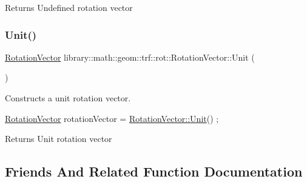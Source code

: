 \begin{DoxyReturn}{Returns}
Undefined rotation vector 
\end{DoxyReturn}
\mbox{\label{classlibrary_1_1math_1_1geom_1_1trf_1_1rot_1_1_rotation_vector_a6dd13d867fa6080a5d45be164ce30c9b}} 
\subsubsection{\texorpdfstring{Unit()}{Unit()}}
{\footnotesize\ttfamily \hyperlink{classlibrary_1_1math_1_1geom_1_1trf_1_1rot_1_1_rotation_vector}{Rotation\+Vector} library\+::math\+::geom\+::trf\+::rot\+::\+Rotation\+Vector\+::\+Unit (\begin{DoxyParamCaption}{ }\end{DoxyParamCaption})\hspace{0.3cm}{\ttfamily [static]}}



Constructs a unit rotation vector. 


\begin{DoxyCode}
\hyperlink{classlibrary_1_1math_1_1geom_1_1trf_1_1rot_1_1_rotation_vector_a32b1fab5e81bc24d777324daf5849205}{RotationVector} rotationVector = \hyperlink{classlibrary_1_1math_1_1geom_1_1trf_1_1rot_1_1_rotation_vector_a6dd13d867fa6080a5d45be164ce30c9b}{RotationVector::Unit}() ;
\end{DoxyCode}


\begin{DoxyReturn}{Returns}
Unit rotation vector 
\end{DoxyReturn}


\subsection{Friends And Related Function Documentation}
\mbox{\label{classlibrary_1_1math_1_1geom_1_1trf_1_1rot_1_1_rotation_vector_aa66ba2fd706a441ee39d06857842ecfe}} 
